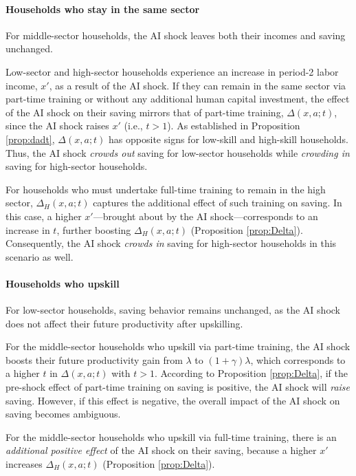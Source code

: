 \documentclass[12pt]{article}
\begin{document}
\paragraph{Households who stay in the same sector}
For middle-sector households, the AI shock leaves both their incomes and saving unchanged.

Low-sector and high-sector households experience an increase in period-2 labor income, $x'$, as a result of the AI shock. If they can remain in the same sector via part-time training or without any additional human capital investment, the effect of the AI shock on their saving mirrors that of part-time training, $\Delta(x,a;t)$, since the AI shock raises $x'$ (i.e., $t>1$). As established in Proposition \ref{prop:dadt}, $\Delta(x,a;t)$ has opposite signs for low-skill and high-skill households. Thus, the AI shock \textit{crowds out} saving for low-sector households while \textit{crowding in} saving for high-sector households.

For households who must undertake full-time training to remain in the high sector, $\Delta_{H}(x,a;t)$ captures the additional effect of such training on saving. In this case, a higher $x'$—brought about by the AI shock—corresponds to an increase in $t$, further boosting $\Delta_{H}(x,a;t)$ (Proposition \ref{prop:Delta}). Consequently, the AI shock \textit{crowds in} saving for high-sector households in this scenario as well.


\paragraph{Households who upskill} For low-sector households, saving behavior remains unchanged, as the AI shock does not affect their future productivity after upskilling.

For the middle-sector households who upskill via part-time training, the AI shock boosts their future productivity gain from $\lambda$ to $(1+\gamma)\lambda$, which corresponds to a higher $t$ in $\Delta(x,a;t)$ with $t>1$. According to Proposition \ref{prop:Delta}, if the pre-shock effect of part-time training on saving is positive, the AI shock will \textit{raise} saving. However, if this effect is negative, the overall impact of the AI shock on saving becomes ambiguous.

For the middle-sector households who upskill via full-time training, there is an \textit{additional positive effect} of the AI shock on their saving, because a higher $x'$ increases $\Delta_{H}(x,a;t)$ (Proposition \ref{prop:Delta}).
\end{document}
